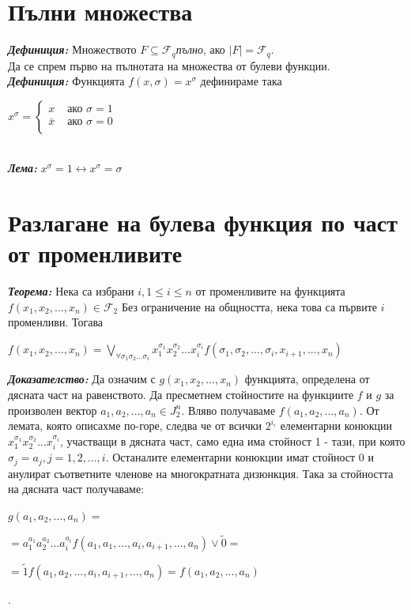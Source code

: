 \documentclass[11pt]{article} %
\newcommand{\italicBold}[1]{\textbf{\emph{#1}}}
\newcommand{\definition}{\italicBold{Дефиниция: }}
\newcommand{\theorem}{\italicBold{Теорема: }}
\newcommand{\lemma}{\italicBold{Лема: }}
\newcommand{\proof}{\italicBold{Доказателство: }}
\begin{document}
\section{Пълни множества}
\definition Множеството $F \subseteq \mathcal{F}_{q}$\textit{пълно}, ако $|F| = \mathcal{F}_{q}$.\\

Да се спрем първо на пълнотата на множества от булеви функции. \\

\definition Функцията $f(x, \sigma) = x ^{\sigma}$ дефинираме така \\
\centerline{$x^{\sigma} = 
	\begin{cases}
		x & \text{ ако } \sigma = 1 \\
		\bar{x} & \text{ ако } \sigma = 0 \\
	\end{cases}
$}\\
\lemma $x^{\sigma} = 1 \leftrightarrow x^{\sigma} = \sigma$

\section{Разлагане на булева функция по част от променливите}
\theorem Нека са избрани $i, 1 \leq i \leq n$ от променливите на функцията $f(x_{1}, x_{2}, ..., x_{n}) \in \mathcal{F}_{2}$ Без ограничение на общността, нека това са първите $i$ променливи. Тогава \\

\centerline{$f(x_{1}, x_{2}, ..., x_{n}) = \underset{\forall \sigma_{1}\sigma_{2}...\sigma_{i}}{\bigvee} x_{1}^{\sigma_1}x_{2}^{\sigma_2} ... x_{i}^{\sigma_i} f(\sigma_{1}, \sigma_{2}, ..., \sigma_{i}, x_{i+1}, ..., x_{n})$}

\proof Да означим с $g(x_{1}, x_{2}, ..., x_{n})$ функцията, определена от дясната част на равенството. Да пресметнем стойностите на функциите $f$ и $g$ за произволен вектор $a_{1}, a_{2}, ..., a_{n} \in J^{n}_{2}$. Вляво получаваме $f(a_{1}, a_{2}, ..., a_{n})$. От лемата, която описахме по-горе, следва че от всички $2^{i_\iota}$ елементарни конюкции $x_{1}^{\sigma_1} x_{2}^{\sigma_2} ... x_{i}^{\sigma_i}$, участващи в дясната част, само една има стойност 1 - тази, при която $\sigma_{j} = a_{j}, j = 1, 2, ..., i$. Останалите елементарни конюкции имат стойност 0 и анулират съответните членове на многократната дизюнкция. Така за стойността на дясната част получаваме: \\

\centerline{$g(a_{1}, a_{2}, ..., a_{n}) = $}
\centerline{$ = a_{1}^{a_1} a_{2}^{a_2} ... a_{i}^{a_i} f(a_{1}, a_{1}, ..., a_{i}, a_{i+1}, ..., a_{n})\vee \tilde{0} = $}
\centerline{$ = \tilde{1}f(a_{1}, a_{2}, ..., a_{i}, a_{i+1},..., a_{n}) = f(a_{1}, a_{2}, ..., a_{n})$}.
\end{document}
